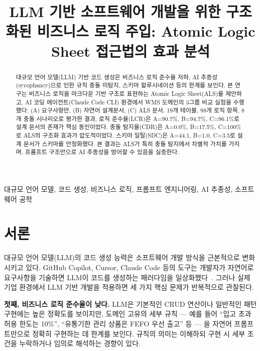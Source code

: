 \documentclass[conference]{IEEEtran}
\begin{document}
\title{LLM 기반 소프트웨어 개발을 위한 구조화된 비즈니스 로직 주입: Atomic Logic Sheet 접근법의 효과 분석}

\author{
}

\maketitle

\begin{abstract}
대규모 언어 모델(LLM) 기반 코드 생성은 비즈니스 로직 준수율 저하, AI 추종성(sycophancy)으로 인한 규칙 충돌 미탐지, 스키마 할루시네이션 등의 한계를 보인다. 본 연구는 비즈니스 로직을 마크다운 기반 구조로 표현하는 Atomic Logic Sheet(ALS)를 제안하고, AI 코딩 에이전트(Claude Code CLI) 환경에서 WMS 도메인의 3그룹 비교 실험을 수행했다: (A) 요구사항만, (B) 자연어 설계문서, (C) ALS 문서. 19개 테이블, 98개 로직 항목, 8개 충돌 시나리오로 평가한 결과, 로직 준수율(LCR)은 A=90.7\%, B=94.7\%, C=96.1\%로 설계 문서의 존재가 핵심 동인이었다. 충돌 탐지율(CDR)은 A=0.0\%, B=17.5\%, C=100\%로 ALS의 구조화 효과가 압도적이었다. 스키마 일탈(SDC)은 A=44.1, B=1.0, C=3.5로 설계 문서가 스키마를 안정화했다. 본 결과는 ALS가 특히 충돌 탐지에서 차별적 가치를 가지며, 프롬프트 구조만으로 AI 추종성을 방어할 수 있음을 실증한다.
\end{abstract}

\begin{IEEEkeywords}
대규모 언어 모델, 코드 생성, 비즈니스 로직, 프롬프트 엔지니어링, AI 추종성, 소프트웨어 공학
\end{IEEEkeywords}

\section{서론}

대규모 언어 모델(LLM)의 코드 생성 능력은 소프트웨어 개발 방식을 근본적으로 변화시키고 있다. GitHub Copilot, Cursor, Claude Code 등의 도구는 개발자가 자연어로 요구사항을 기술하면 LLM이 코드를 생성하는 패러다임을 일상화했다~\cite{chen2021evaluating, jiang2024survey}. 그러나 실제 기업 환경에서 LLM 기반 개발을 적용하면 세 가지 핵심 문제가 반복적으로 관찰된다.

\textbf{첫째, 비즈니스 로직 준수율이 낮다.} LLM은 기본적인 CRUD 연산이나 일반적인 패턴 구현에는 높은 정확도를 보이지만, 도메인 고유의 세부 규칙 --- 예를 들어 ``입고 초과 허용 한도는 10\%'', ``유통기한 관리 상품은 FEFO 우선 출고'' 등 --- 을 자연어 프롬프트만으로 정확히 구현하는 데 한계를 보인다. 규칙의 의미는 이해하되 구현 시 세부 조건을 누락하거나 임의로 해석하는 경향이 있다.
\end{document}
